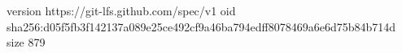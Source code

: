 version https://git-lfs.github.com/spec/v1
oid sha256:d05f5fb3f142137a089e25ce492cf9a46ba794edff8078469a6e6d75b84b714d
size 879
